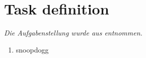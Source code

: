\section{Task definition}
\label{sec:Aufgabenstellung}
\textit{Die Aufgabenstellung wurde aus \cite{LAB} entnommen.}
\begin{enumerate}
    \item snoopdogg
\end{enumerate}